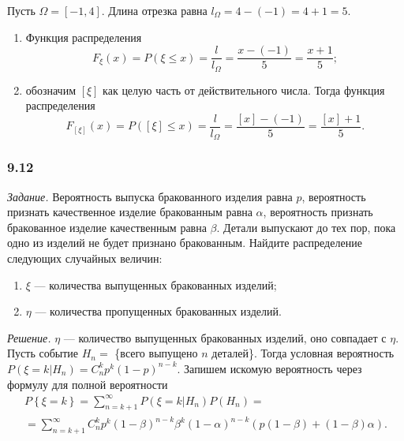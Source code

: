 Пусть $ \Omega = \left[ -1, 4 \right] $.
Длина отрезка равна $l_{ \Omega } = 4 - \left( -1 \right) = 4+1 = 5$.

\begin{enumerate}[label=\alph*)]
\item Функция распределения
$$F_{ \xi} \left( x \right) =
P \left( \xi \leq x \right) =
\frac{l}{l_{ \Omega }} =
\frac{x- \left( -1 \right) }{5} =
\frac{x+1}{5};$$
\item обозначим $ \left[ \xi \right] $ как целую часть от действительного числа.
Тогда функция распределения
$$F_{ \left[ \xi \right] } \left( x \right) =
P \left( \left[ \xi \right] \leq x \right) =
\frac{l}{l_{ \Omega }} =
\frac{ \left[ x \right] - \left( -1 \right) }{5} =
\frac{ \left[ x \right] +1}{5}.$$
\end{enumerate}

\subsubsection*{9.12}

\textit{Задание.}
Вероятность выпуска бракованного изделия равна $p$,
вероятность признать качественное изделие бракованным равна $ \alpha $, вероятность признать бракованное изделие качественным равна $ \beta $.
Детали выпускают до тех пор, пока одно из изделий не будет признано бракованным.
Найдите распределение следующих случайных величин:
\begin{enumerate}[label=\alph*)]
\item $ \xi $ --- количества выпущенных бракованных изделий;
\item $ \eta $ --- количества пропущенных бракованных изделий. 
\end{enumerate}

\textit{Решение.} $ \eta $ --- количество выпущенных бракованных изделий, оно совпадает с $ \eta .$
Пусть событие $H_n =$ \{всего выпущено $n$ деталей\}.
Тогда условная вероятность $P \left( \left. \xi = k \right| H_n \right) = C_n^k p^k \left( 1-p \right)^{n-k}$.
Запишем искомую вероятность через формулу для полной вероятности
\begin{equation*}
\begin{split}
P \left\{ \xi = k \right\} =
\sum \limits_{n=k+1}^{ \infty } P \left( \left. \xi = k \right| H_n \right) P \left( H_n \right) = \\
= \sum \limits_{n=k+1}^{ \infty } C_n^k p^k \left( 1 - \beta \right)^{n-k} \beta^k
\left( 1 - \alpha \right)^{n-k} \left( p \left( 1 - \beta \right) + \left( 1 - \beta \right) \alpha \right).
\end{split}
\end{equation*}


